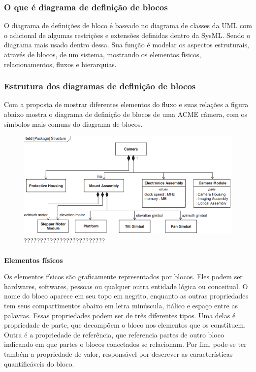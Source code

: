 \subsubsection{O que é diagrama de definição de blocos}

O diagrama de definições de bloco é baseado no diagrama de classes da UML com o adicional de algumas restrições e extensões definidas dentro da SysML. Sendo o diagrama mais usado dentro dessa. Sua função é modelar os aspectos estruturais, através de blocos, de um sistema, mostrando os elementos físicos, relacionamentos, fluxos e hierarquias.

\subsubsection{Estrutura dos diagramas de definição de blocos}

Com a proposta de mostrar diferentes elementos do fluxo e suas relações a figura abaixo mostra o diagrama de definição de blocos de uma ACME câmera, com os símbolos mais comuns do diagrama de blocos.


\begin{figure}[h]
\centering
\includegraphics[width=\textwidth,height=\textheight,keepaspectratio]{figures/diagrama de blocos.PNG}
\caption{?????????????????????????}
\label{fig:block_diagram}
\end{figure}

\paragraph{}
 \textbf{Elementos físicos} 
 
 
Os elementos físicos são graficamente representados por blocos. Eles podem ser hardwares, softwares, pessoas ou qualquer outra entidade lógica ou conceitual. O nome do bloco aparece em seu topo em negrito, enquanto as outras propriedades tem seus compartimentos abaixo em letra minúscula, itálico e espaço entre as palavras. Essas propriedades podem ser de três diferentes tipos. Uma delas é propriedade de parte, que decompõem o bloco nos elementos que os constituem. Outra é a propriedade de referência, que referencia partes de outro bloco indicando em que partes o blocos conectados se relacionam. Por fim, pode-se ter também a propriedade de valor, responsável por descrever as características quantificáveis do bloco.

